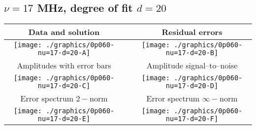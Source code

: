 

% 

\clearpage{}
\break{}

\subsection{$\nu = 17$ MHz, degree of fit $d = 20$}

\begin{table}[h]
    \begin{center}
        \begin{tabular}{ccc}
            Data and solution & \quad & Residual errors \\\hline
            \texttt{[image: ./graphics/0p060-nu=17-d=20-A]} &&
            \texttt{[image: ./graphics/0p060-nu=17-d=20-B]} \\[15pt]
            Amplitudes with error bars && Amplitude signal--to--noise \\\hline
            \texttt{[image: ./graphics/0p060-nu=17-d=20-C]} &&
            \texttt{[image: ./graphics/0p060-nu=17-d=20-D]} \\[15pt]
            Error spectrum $2-$norm && Error spectrum $\infty-$norm \\\hline
            \texttt{[image: ./graphics/0p060-nu=17-d=20-E]} &&
            \texttt{[image: ./graphics/0p060-nu=17-d=20-F]} \\[15pt]
        \end{tabular}
    \end{center}
\label{fig:elev=60, nu=17}
\end{table}



\endinput
